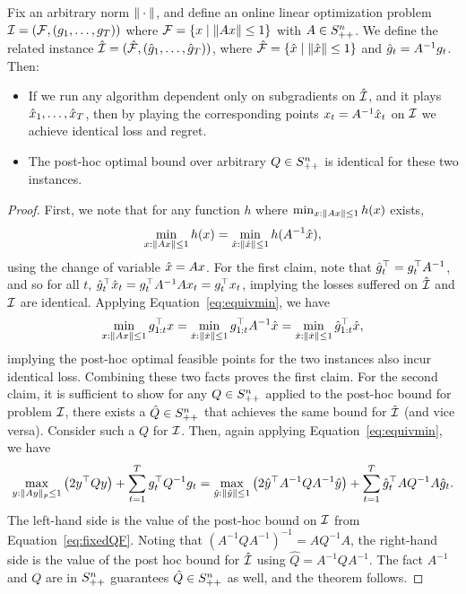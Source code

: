 \begin{theorem}\label{thm:blackbox}
Fix an arbitrary norm $\| \cdot \|$, and define an online linear
optimization problem $\mathcal{I} = (\mathcal{F}, (g_1,
\dots, g_T))$ where $\mathcal{F} = \left\{x \mid \| Ax \| \leq 1\right\}$ with $A
\in S^n_{++}$.  We define the  related instance
$\hat{\mathcal{I}} = (\hat{\mathcal{F}}, (\hat{g}_1, \dots, \hat{g}_T))$, where $\hat{\mathcal{F}} = \left\{\hat{x} \mid
\|  \hat{x}  \|
\leq 1\right\}$ and $\hat{g}_t = A^{-1} g_t$.  Then:
\begin{itemize}
 \item If we run any algorithm dependent only on subgradients on
  $\hat{\mathcal{I}}$, and it plays $\hat{x}_1, \dots, \hat{x}_T$, then by playing the
  corresponding points $x_t = A^{-1}\hat{x}_t$ on $\mathcal{I}$ we achieve
  identical loss and regret.

  \item The post-hoc optimal bound over arbitrary $Q \in S^n_{++}$ is
  identical for these two instances. 
\end{itemize}
\end{theorem}

\begin{proof}
First, we note that for any function $h$ where $\min_{x : \| Ax \| \leq 1} h(x)$ exists,
\begin{equation}\label{eq:equivmin}
   \min_{x : \| Ax \| \leq 1} h(x) 
     = \min_{\hat{x} : \| \hat{x} \| \leq 1} h(A^{-1}\hat{x}),
\end{equation}
using the change of variable $\hat{x} = Ax$.
For the first claim, note that $\hat{g}_t^\top = g_t^\top A^{-1}$, and so
for all $t$, $\hat{g}_t^\top \hat{x}_t = g_t^\top A^{-1} A x_t = g_t^\top x_t$,
implying the losses suffered on $\hat{\mathcal{I}}$ and $\mathcal{I}$ are identical.
Applying Equation~\eqref{eq:equivmin}, we have
\[
\min_{x: \| A x \| \le 1} g_{1:t}^\top x
  = \min_{\hat{x}: \| \hat{x} \| \le 1} g_{1:t}^\top A^{-1}\hat{x}
  = \min_{\hat{x}: \| \hat{x} \| \le 1} \hat{g}_{1:t}^\top \hat{x},
\]
implying the post-hoc optimal feasible points for the two instances
also incur identical loss.  Combining these two facts proves the
first claim.
For the second claim, it is sufficient to show for any $Q \in S^n_{++}$
applied to the post-hoc bound for problem $\mathcal{I}$, there exists a
$\hat{Q} \in S^n_{++}$ that achieves the same bound for $\hat{\mathcal{I}}$ (and
vice versa).  Consider such a $Q$ for $\mathcal{I}$.  Then, again applying
Equation~\eqref{eq:equivmin}, we have
\begin{align*}
  \max_{y : \| Ay \|_p \leq 1} \left(2y^\top Qy\right) 
      + \sum_{t=1}^T g_t^\top Q^{-1}g_t
= \max_{\hat{y}:\| \hat{y} \| \leq 1} \left(2\hat{y}^\top A^{-1}Q A^{-1} \hat{y}\right)
      + \sum_{t=1}^T \hat{g}_t^\top AQ^{-1}A\hat{g}_t.
\end{align*}
The left-hand side is the value of the post-hoc bound on $\mathcal{I}$ from
Equation~\eqref{eq:fixedQF}.  Noting that $(A^{-1}Q A^{-1})^{-1} =
AQ^{-1}A$, the right-hand side is the value of the post hoc bound for
$\hat{\mathcal{I}}$ using $\hat{Q} = A^{-1}Q A^{-1}.$ The fact $A^{-1}$ and $Q$
are in $S^n_{++}$ guarantees $\hat{Q} \in S^n_{++}$ as well, and the theorem
follows.
\end{proof}

